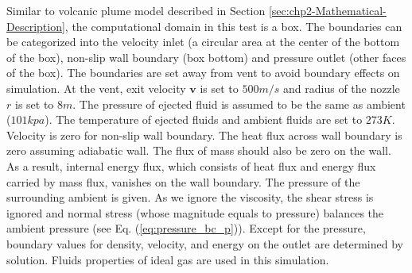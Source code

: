Similar to volcanic plume model described in Section \ref{sec:chp2-Mathematical-Description}, the computational domain in this test is a box. The boundaries can be categorized into the velocity inlet (a circular area at the center of the bottom of the box), non-slip wall boundary (box bottom) and pressure outlet (other faces of the box). The boundaries are set away from vent to avoid boundary effects on simulation.
At the vent, exit velocity $\textbf{v}$ is set to $500 m / s$ and radius of the nozzle $r$ is set to $8m $. The pressure of ejected fluid is assumed to be the same as ambient ($101 kpa$). The temperature of ejected fluids and ambient fluids are set to $273 K$. 
Velocity is zero for non-slip wall boundary. The heat flux across wall boundary is zero assuming adiabatic wall. The flux of mass should also be zero on the wall. As a result, internal energy flux, which consists of heat flux and energy flux carried by mass flux, vanishes on the wall boundary. 
The pressure of the surrounding ambient is given. As we ignore the viscosity, the shear stress is ignored and normal stress (whose magnitude equals to pressure) balances the ambient pressure (see Eq. (\ref{eq:pressure_bc_p})).
Except for the pressure, boundary values for density, velocity, and energy on the outlet are determined by solution. Fluids properties of ideal gas are used in this simulation.

